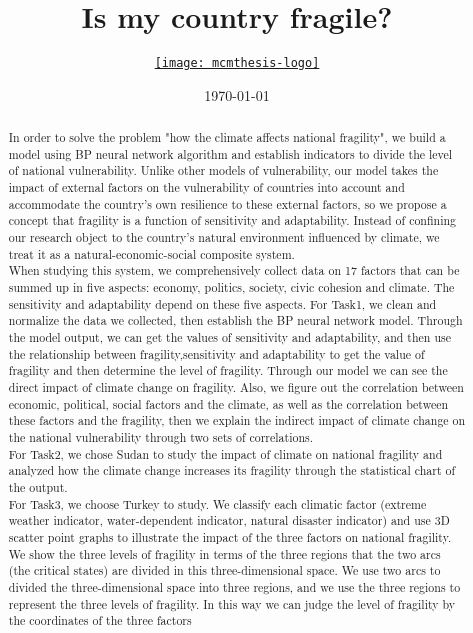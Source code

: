 \documentclass{mcmthesis}
\title{Is my country fragile?}
\author{\small \href{http://www.latexstudio.net/}
  {\texttt{[image: mcmthesis-logo]}}}
\date{\today}
\begin{document}
\begin{abstract}
  In order to solve the problem "how the climate affects national fragility", we build a model using BP neural network algorithm and establish indicators to divide the level of national vulnerability. Unlike other models of vulnerability, our model takes the impact of external factors on the vulnerability of countries into account  and accommodate the country's own resilience to these external factors, so we propose a concept that fragility is a function of sensitivity and adaptability. Instead of confining our research object to the country's natural environment influenced by climate, we treat it as a natural-economic-social composite system. \\
  When studying this system, we comprehensively collect data on 17 factors that can be summed up in five aspects: economy, politics, society, civic cohesion and climate. The sensitivity and adaptability depend on these five aspects.
  For Task1, we clean and normalize the data we collected, then establish the BP neural network model. Through the model output, we can get the values ​​of sensitivity and adaptability, and then use the relationship between fragility,sensitivity and adaptability to get the value of fragility and then determine the level of fragility. Through our model we can see the direct impact of climate change on fragility. Also, we figure out the correlation between economic, political, social factors and the climate, as well as the correlation between these factors and the fragility, then we explain the indirect impact of climate change on the national vulnerability through two sets of correlations.\\
  For Task2, we chose Sudan to study the impact of climate on national fragility and analyzed how the climate change increases its fragility through the statistical chart of the output.\\
  For Task3, we choose Turkey to study. We classify each climatic factor (extreme weather indicator, water-dependent indicator, natural disaster indicator) and use 3D scatter point graphs to illustrate the impact of the three factors on national fragility. We show the three levels of fragility in terms of the three regions that the two arcs (the critical states) are divided in this three-dimensional space. We use two arcs to divided the three-dimensional space into three regions, and we use the three regions to represent the three levels of fragility. In this way we can judge the level of fragility by the coordinates of the three factors\\

\end{abstract}
\end{document}
